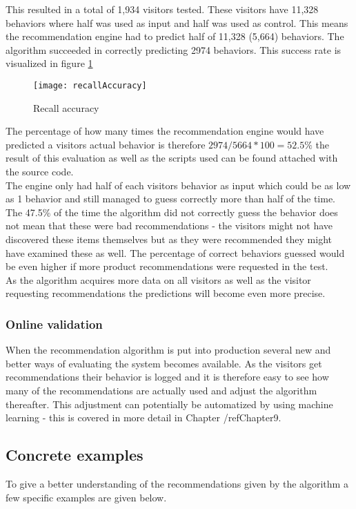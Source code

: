 This resulted in a total of 1,934 visitors tested. These visitors have 11,328 behaviors where half was used as input and half was used as control. This means the recommendation engine had to predict half of 11,328 (5,664) behaviors. The algorithm succeeded in correctly predicting 2974 behaviors. This success rate is visualized in figure \ref{recallAccuracy}   \\
\begin{figure}[H]
\centering
\texttt{[image: recallAccuracy]}
\caption{Recall accuracy}
\label{recallAccuracy}
\end{figure}
The percentage of how many times the recommendation engine would have predicted a visitors actual behavior is therefore \begin{math}2974/5664*100=52.5\%\end{math} the result of this evaluation as well as the scripts used can be found attached with the source code. \\
The engine only had half of each visitors behavior as input which could be as low as 1 behavior and still managed to guess correctly more than half of the time. The 47.5\% of the time the algorithm did not correctly guess the behavior does not mean that these were bad recommendations - the visitors might not have discovered these items themselves but as they were recommended they might have examined these as well. The percentage of correct behaviors guessed would be even higher if more product recommendations were requested in the test. \\
As the algorithm acquires more data on all visitors as well as the visitor requesting recommendations the predictions will become even more precise.

\subsubsection{Online validation}
When the recommendation algorithm is put into production several new and better ways of evaluating the system becomes available. As the visitors get recommendations their behavior is logged and it is therefore easy to see how many of the recommendations are actually used and adjust the algorithm thereafter.
This adjustment can potentially be automatized by using machine learning - this is covered in more detail in Chapter /ref{Chapter9}.

\subsection{Concrete examples}
To give a better understanding of the recommendations given by the algorithm a few specific examples are given below. \\

